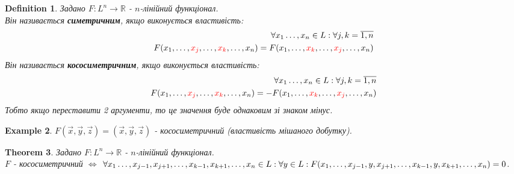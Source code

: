 \documentclass[a4paper, 10pt]{article}
\theoremstyle{theoremdd}
\newtheorem{theorem}{Theorem}[subsection]
\newtheorem{definition}[theorem]{Definition}
\newtheorem{example}[theorem]{Example}
\begin{document}
	\begin{definition}
	Задано $F: L^n \to \mathbb{R}$ - $n$-лінійний функціонал.\\
	Він називається \textbf{симетричним}, якщо виконується властивість:
	\begin{align*}
		\forall x_1 \dots, x_n \in L: \forall j,k = \overline{1,n}\\
	F(x_1, \dots, \textcolor{red}{x_j}, \dots, \textcolor{red}{x_k}, \dots, x_n) = F(x_1, \dots, \textcolor{red}{x_k}, \dots, \textcolor{red}{x_j}, \dots, x_n)
	\end{align*}
	Він називається \textbf{кососиметричним}, якщо виконується властивість:
	\begin{align*}
	\forall x_1 \dots, x_n \in L: \forall j,k = \overline{1,n}\\
	F(x_1, \dots, \textcolor{red}{x_j}, \dots, \textcolor{red}{x_k}, \dots, x_n) = -F(x_1, \dots, \textcolor{red}{x_k}, \dots, \textcolor{red}{x_j}, \dots, x_n)
	\end{align*}
	Тобто якщо переставити 2 аргументи, то це значення буде однаковим зі знаком мінус.
	\end{definition}
	
	\begin{example}
	$F(\vec{x},\vec{y},\vec{z}) = (\vec{x}, \vec{y}, \vec{z})$ - кососиметричний (властивість мішаного добутку).
	\end{example}
	
	\begin{theorem}
	Задано $F: L^n \to \mathbb{R}$ - $n$-лінійний функціонал.\\
	$F$ - кососиметричний $\iff$ $\forall x_1 \dots, x_{j-1}, x_{j+1}, \dots, x_{k-1}, x_{k+1}, \dots, x_{n} \in L: \forall y \in L: \\ F(x_1,\dots, x_{j-1}, y, x_{j+1}, \dots, x_{k-1}, y, x_{k+1}, \dots, x_n) = 0$.
	\end{theorem}
	
\end{document}
